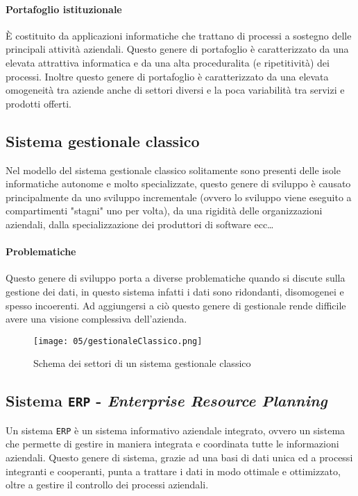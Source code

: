         \paragraph{Portafoglio istituzionale} È costituito da applicazioni informatiche che trattano di processi a sostegno delle principali attività aziendali. Questo genere di portafoglio è caratterizzato da una elevata attrattiva informatica e da una alta proceduralita (e ripetitività) dei processi. Inoltre questo genere di portafoglio è caratterizzato da una elevata omogeneità tra aziende anche di settori diversi e la poca variabilità tra servizi e prodotti offerti.
    \subsection{Sistema gestionale classico}
        Nel modello del sistema gestionale classico solitamente sono presenti delle isole informatiche autonome e molto specializzate, questo genere di sviluppo è causato principalmente da uno sviluppo incrementale (ovvero lo sviluppo viene eseguito a compartimenti "stagni" uno per volta), da una rigidità delle organizzazioni aziendali, dalla specializzazione dei produttori di software ecc\dots
        \paragraph{Problematiche} Questo genere di sviluppo porta a diverse problematiche quando si discute sulla gestione dei dati, in questo sistema infatti i dati sono ridondanti, disomogenei e spesso incoerenti. Ad aggiungersi a ciò questo genere di gestionale rende difficile avere una visione complessiva dell'azienda.
        \begin{figure}[H]
            \centering
            \texttt{[image: 05/gestionaleClassico.png]}
            \caption{Schema dei settori di un sistema gestionale classico}
        \end{figure}
    \subsection{Sistema \texttt{ERP} - \textit{Enterprise Resource Planning}}
        Un sistema \texttt{ERP} è un sistema informativo aziendale integrato, ovvero un sistema che permette di gestire in maniera integrata e coordinata tutte le informazioni aziendali. Questo genere di sistema, grazie ad una basi di dati unica ed a processi integranti e cooperanti, punta a trattare i dati in modo ottimale e ottimizzato, oltre a gestire il controllo dei processi aziendali.
